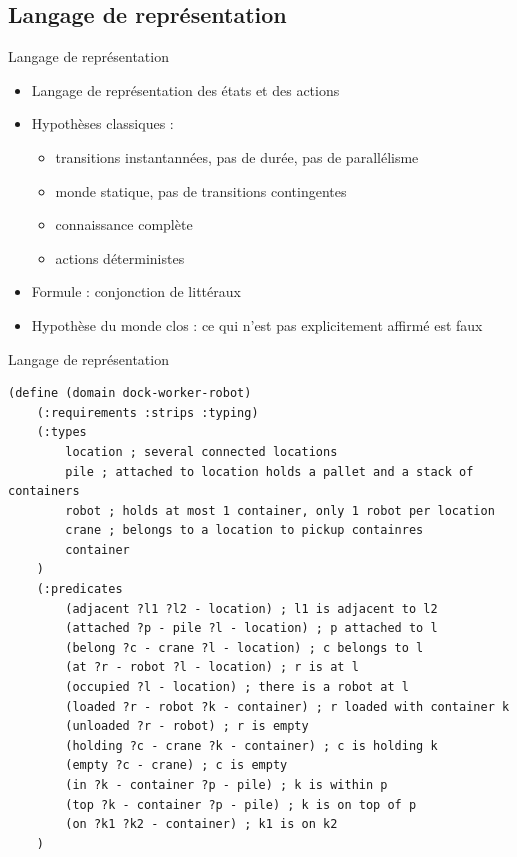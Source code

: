 \documentclass[compress]{beamer}
\begin{document}
\subsection{Langage de représentation}
\begin{frame}{Langage de représentation}
\begin{itemize}
\item Langage de représentation des états et des actions
\item Hypothèses classiques :
	\begin{itemize}
	\item transitions instantannées, pas de durée, pas de parallélisme
	\item monde statique, pas de transitions contingentes
	\item connaissance complète
	\item actions déterministes
	\end{itemize}
\item Formule : conjonction de littéraux
\item Hypothèse du monde clos : ce qui n'est pas explicitement affirmé est faux
\end{itemize}
\end{frame}

\begin{frame}[containsverbatim]{Langage de représentation}
\begin{lstlisting}
(define (domain dock-worker-robot)
	(:requirements :strips :typing)
	(:types
		location ; several connected locations
		pile ; attached to location holds a pallet and a stack of containers
		robot ; holds at most 1 container, only 1 robot per location
		crane ; belongs to a location to pickup containres
		container
	)
	(:predicates
		(adjacent ?l1 ?l2 - location) ; l1 is adjacent to l2
		(attached ?p - pile ?l - location) ; p attached to l
		(belong ?c - crane ?l - location) ; c belongs to l
		(at ?r - robot ?l - location) ; r is at l
		(occupied ?l - location) ; there is a robot at l
		(loaded ?r - robot ?k - container) ; r loaded with container k
		(unloaded ?r - robot) ; r is empty
		(holding ?c - crane ?k - container) ; c is holding k
		(empty ?c - crane) ; c is empty
		(in ?k - container ?p - pile) ; k is within p
		(top ?k - container ?p - pile) ; k is on top of p
		(on ?k1 ?k2 - container) ; k1 is on k2
	)
\end{lstlisting}
\end{frame}
\end{document}
